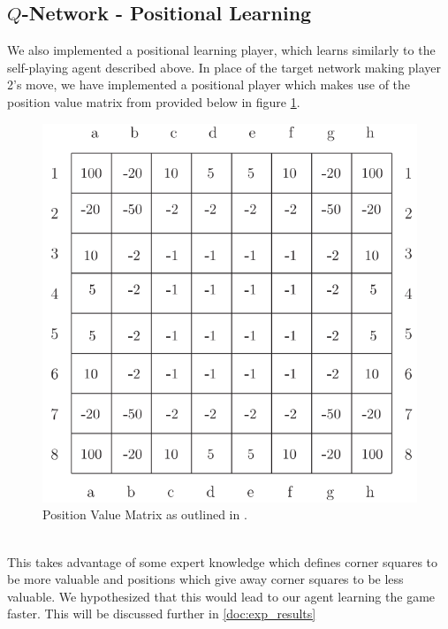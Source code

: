 \documentclass{article}
\begin{document}
\subsection{\label{doc:positional}$Q$-Network - Positional Learning}
We also implemented a positional learning player, which learns similarly to the self-playing agent described above. In place of the target network making player 2's move, we have implemented a positional player which makes use of the position value matrix from \cite{vanEck2008} provided below in figure \ref{fig:pos_vals}.
\begin{figure}[ht]
\centering
\includegraphics[width=0.6\linewidth]{figures/position_vals.png}
\caption{\label{fig:pos_vals}Position Value Matrix as outlined in \cite{vanEck2008}.}
\end{figure}
\\
This takes advantage of some expert knowledge which defines corner squares to be more valuable and positions which give away corner squares to be less valuable. We hypothesized that this would lead to our agent learning the game faster. This will be discussed further in \ref{doc:exp_results}
\end{document}
